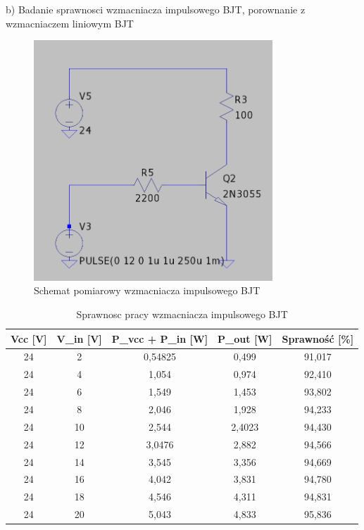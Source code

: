 \documentclass[11pt]{article}
\begin{document}
b) Badanie sprawnosci wzmacniacza impulsowego BJT, porownanie z wzmacniaczem liniowym BJT

\begin{figure}[H]
\centering
\includegraphics[width=0.8\textwidth]{aun1_impulsowy_bjt.png}
\caption{Schemat pomiarowy wzmacniacza impulsowego BJT}
\end{figure}

\begin{table}[H]
\centering
\begin{tabular}{|c|c|c|c|c|}
\hline
\textbf{Vcc [V]} & \textbf{V\_in [V]} & \textbf{P\_vcc + P\_in [W]} & \textbf{P\_out [W]} & \textbf{Sprawność [\%]} \\
\hline
24 & 2  & 0{,}54825 & 0{,}499   & 91{,}017 \\
\hline
24 & 4  & 1{,}054   & 0{,}974   & 92{,}410 \\
\hline
24 & 6  & 1{,}549   & 1{,}453   & 93{,}802 \\
\hline
24 & 8  & 2{,}046   & 1{,}928   & 94{,}233 \\
\hline
24 & 10 & 2{,}544   & 2{,}4023  & 94{,}430 \\
\hline
24 & 12 & 3{,}0476  & 2{,}882   & 94{,}566 \\
\hline
24 & 14 & 3{,}545   & 3{,}356   & 94{,}669 \\
\hline
24 & 16 & 4{,}042   & 3{,}831   & 94{,}780 \\
\hline
24 & 18 & 4{,}546   & 4{,}311   & 94{,}831 \\
\hline
24 & 20 & 5{,}043   & 4{,}833   & 95{,}836 \\
\hline
\end{tabular}
\caption{Sprawnosc pracy wzmacniacza impulsowego BJT}
\end{table}
\end{document}
